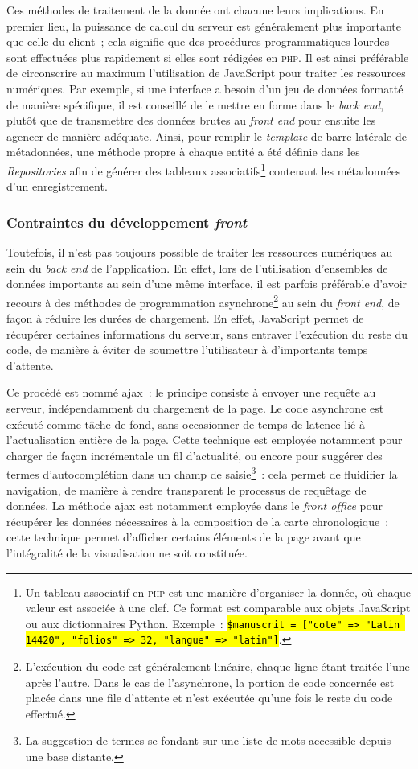\documentclass[a4paper,12pt,twoside]{book}
\let\OldTexttt\texttt
\renewcommand{\texttt}[1]{\OldTexttt{\hl{#1}}}
\newcommand{\eng}{\emph}
\newcommand{\php}{\textsc{php}\xspace}
\newcommand{\fo}{\eng{front office}\xspace}
\newcommand{\ajax}{\gls{ajax}\xspace}
\begin{document}
Ces méthodes de traitement de la donnée ont chacune leurs implications. En premier lieu, la puissance de calcul du serveur est généralement plus importante que celle du client~; cela signifie que des procédures programmatiques lourdes sont effectuées plus rapidement si elles sont rédigées en \php. Il est ainsi préférable de circonscrire au maximum l'utilisation de JavaScript pour traiter les ressources numériques. Par exemple, si une interface a besoin d'un jeu de données formatté de manière spécifique, il est conseillé de le mettre en forme dans le \eng{back end}, plutôt que de transmettre des données brutes au \eng{front end} pour ensuite les agencer de manière adéquate. Ainsi, pour remplir le \eng{template} de barre latérale de métadonnées, une méthode propre à chaque entité a été définie dans les \eng{Repositories} afin de générer des tableaux associatifs\footnote{Un tableau associatif en \php est une manière d'organiser la donnée, où chaque valeur est associée à une clef. Ce format est comparable aux objets JavaScript ou aux dictionnaires Python. \newline Exemple~: \texttt{\$manuscrit = ["cote" => "Latin 14420", "folios" => 32, "langue" => "latin"]}.} contenant les métadonnées d'un enregistrement.

			\subsubsection{Contraintes du développement \eng{front}}
Toutefois, il n'est pas toujours possible de traiter les ressources numériques au sein du \eng{back end} de l'application. En effet, lors de l'utilisation d'ensembles de données importants au sein d'une même interface, il est parfois préférable d'avoir recours à des méthodes de programmation asynchrone\footnote{L'exécution du code est généralement linéaire, chaque ligne étant traitée l'une après l'autre. Dans le cas de l'asynchrone, la portion de code concernée est placée dans une file d'attente et n'est exécutée qu'une fois le reste du code effectué.} au sein du \eng{front end}, de façon à réduire les durées de chargement. En effet, JavaScript permet de récupérer certaines informations du serveur, sans entraver l'exécution du reste du code, de manière à éviter de soumettre l'utilisateur à d'importants temps d'attente.

Ce procédé est nommé \ajax~: le principe consiste à envoyer une requête au serveur, indépendamment du chargement de la page. Le code asynchrone est exécuté comme tâche de fond, sans occasionner de temps de latence lié à l'actualisation entière de la page. Cette technique est employée notamment pour charger de façon incrémentale un fil d'actualité, ou encore pour suggérer des termes d'autocomplétion dans un champ de saisie\footnote{La suggestion de termes se fondant sur une liste de mots accessible depuis une base distante.}~: cela permet de fluidifier la navigation, de manière à rendre transparent le processus de requêtage de données. La méthode \ajax est notamment employée dans le \fo pour récupérer les données nécessaires à la composition de la carte chronologique~: cette technique permet d'afficher certains éléments de la page avant que l'intégralité de la visualisation ne soit constituée.
\end{document}
